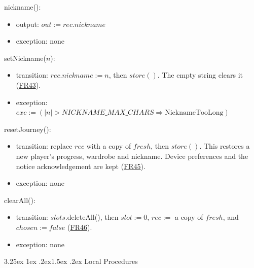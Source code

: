 \documentclass[10pt, titlepage]{article}
\makeatletter
\newcommand{\srsurl}{https://team-hindsight.github.io/ophthamology-game/SRS/SRS.pdf}
\newcommand{\srsitemref}[2]{\href{\srsurl\#nameddest=#1}{#2}}
\renewcommand\paragraph{\@startsection{paragraph}{4}{\z@}%
  {3.25ex \@plus 1ex \@minus .2ex}{1.5ex \@plus .2ex}%
  {\normalfont\normalsize\bfseries}}
\newcommand{\T}[1]{\mathit{#1}}          %
\newcommand{\out}{\mathit{out}}
\newcommand{\exc}{\mathit{exc}}
\newcommand{\false}{\mathit{false}}
\makeatother
\begin{document}
\begin{samepage}
\noindent nickname():
\begin{itemize}
\item output: $\out := \T{rec}.\T{nickname}$
\item exception: none
\end{itemize}
\end{samepage}
\par\pagebreak[0]

\begin{samepage}
\noindent setNickname($n$):
\begin{itemize}
\item transition: $\T{rec}.\T{nickname} := n$, then $\T{store}()$.
  The empty string clears it (\srsitemref{FR_Nickname}{FR43}).
\item exception: $\exc := (|n| > \T{NICKNAME\_MAX\_CHARS}
  \Rightarrow \text{NicknameTooLong})$
\end{itemize}
\end{samepage}
\par\pagebreak[0]

\begin{samepage}
\noindent resetJourney():
\begin{itemize}
\item transition: replace $\T{rec}$ with a copy of $\T{fresh}$,
  then $\T{store}()$. This restores a new player's progress, wardrobe and
  nickname. Device preferences and the notice acknowledgement are kept
  (\srsitemref{FR_ResetJourney}{FR45}).
\item exception: none
\end{itemize}
\end{samepage}
\par\pagebreak[0]

\begin{samepage}
\noindent clearAll():
\begin{itemize}
\item transition: $\T{slots}$.deleteAll(), then $\T{slot} := 0$,
  $\T{rec} :=$ a copy of $\T{fresh}$, and $\T{chosen} := \false$
  (\srsitemref{FR_ClearAllData}{FR46}).
\item exception: none
\end{itemize}
\end{samepage}
\par\pagebreak[0]

\paragraph{Local Procedures}
\end{document}
